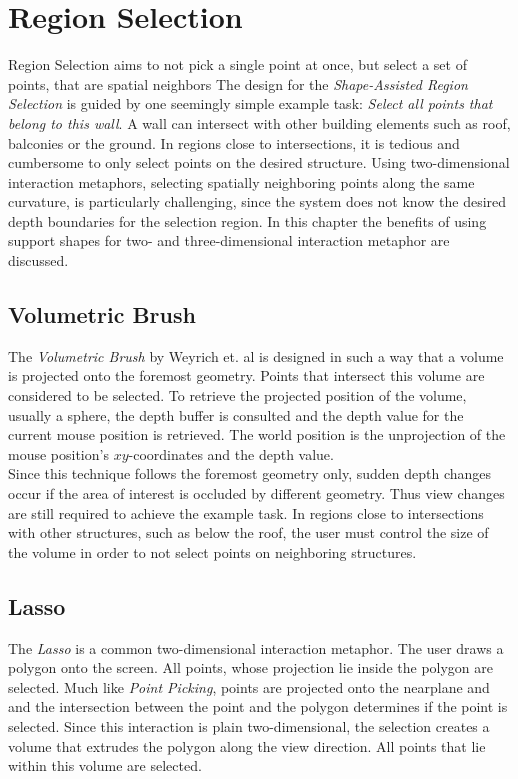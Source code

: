 \section{Region Selection}
Region Selection aims to not pick a single point at once, but select a set of points, that are spatial neighbors
The design for the \textit{Shape-Assisted Region Selection} is guided by one seemingly simple example task: \textit{Select all points that belong to this wall}. A wall can intersect with other building elements such as roof, balconies or the ground. In regions close to intersections, it is tedious and cumbersome to only select points on the desired structure. Using two-dimensional interaction metaphors, selecting spatially neighboring points along the same curvature, is particularly challenging, since the system does not know the desired depth boundaries for the selection region. In this chapter the benefits of using support shapes for two- and three-dimensional interaction metaphor are discussed. 

\subsection{Volumetric Brush}

The \textit{Volumetric Brush} by Weyrich et. al\cite{weyrich2004post} is designed in such a way that a volume is projected onto the foremost geometry. Points that intersect this volume are considered to be selected. To retrieve the projected position of the volume, usually a sphere, the depth buffer is consulted and the depth value for the current mouse position is retrieved. The world position is the unprojection of the mouse position's $xy$-coordinates and the depth value. 
\\
Since this technique follows the foremost geometry only, sudden depth changes occur if the area of interest is occluded by different geometry. Thus view changes are still required to achieve the example task. In regions close to intersections with other structures, such as below the roof, the user must control the size of the volume in order to not select points on neighboring structures. 

\subsection{Lasso}

The \textit{Lasso} is a common two-dimensional interaction metaphor. The user draws a polygon onto the screen. All points, whose projection lie inside the polygon are selected. Much like \textit{Point Picking}, points are projected onto the nearplane and and the intersection between the point and the polygon determines if the point is selected. Since this interaction is plain two-dimensional, the selection creates a volume that extrudes the polygon along the view direction. All points that lie within this volume are selected. 

